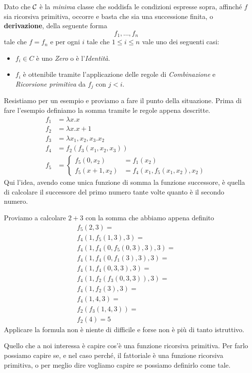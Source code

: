 Dato che $\mathcal{C}$ è la \emph{minima} classe che soddisfa le
condizioni espresse sopra, affinché $f$ sia ricorsiva
primitiva, occorre e basta che sia una successione finita, o
\textbf{derivazione}, della seguente forma
\[ f_1, \dots, f_n \]
tale che $f = f_n$ e per ogni $i$ tale che $1 \leq i \leq n$
vale uno dei seguenti casi:
\begin{itemize}
	\item $f_i \in C$ è uno \emph{Zero} o è l'\emph{Identità}.
	\item $f_i$ è ottenibile tramite l'applicazione delle
	      regole di \emph{Combinazione} e
	      \emph{Ricorsione primitiva} da $f_j$ con $j < i$.
\end{itemize}
Resistiamo per un esempio e proviamo a fare il punto della
situazione. Prima di fare l'esempio definiamo la somma tramite
le regole appena descritte.
\[
	\begin{array}{ll}
		f_1 & = \lambda x.x                    \\
		f_2 & = \lambda x.x + 1                \\
		f_3 & = \lambda x_1, x_2, x_3 . x_2    \\
		f_4 & = f_2 (f_3 (x_1, x_2, x_3))      \\
		f_5 & = \begin{cases}
			        f_5 (0, x_2)     & = f_1 (x_2) \\
			        f_5 (x + 1, x_2) & =
			        f_4 (x_1, f_5(x_1, x_2), x_2)
		        \end{cases}
	\end{array}
\]
Qui l'idea, avendo come unica funzione di somma la funzione
successore, è quella di calcolare il successore del primo
numero tante volte quanto è il secondo numero.

\begin{example}
	Proviamo a calcolare $2 + 3$ con la somma che abbiamo
	appena definito
	\[
		\begin{array}{l}
			f_5(2, 3) =                         \\
			f_4 (1, f_5(1, 3), 3) =             \\
			f_4 (1, f_4(0, f_5 (0, 3), 3), 3) = \\
			f_4 (1, f_4(0, f_1 (3), 3), 3) =    \\
			f_4 (1, f_4(0, 3, 3), 3) =          \\
			f_4 (1, f_2(f_3(0, 3, 3)), 3) =     \\
			f_4 (1, f_2(3), 3) =                \\
			f_4 (1, 4, 3) =                     \\
			f_2 (f_3 (1, 4, 3)) =               \\
			f_2 (4) = 5
		\end{array}
	\]
	Applicare la formula non è niente di difficile e forse
	non è più di tanto istruttivo.
\end{example}

Quello che a noi interessa è capire cos'è una funzione
ricorsiva primitiva. Per farlo possiamo capire se, e nel caso 
perché, il fattoriale è una funzione ricorsiva primitiva, o 
per meglio dire vogliamo capire se possiamo definirlo come tale.

